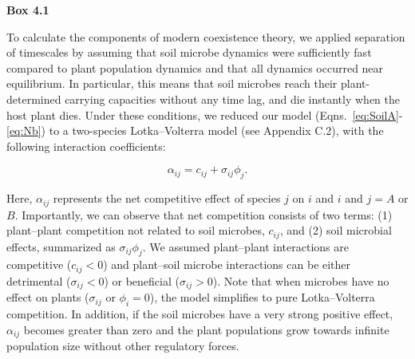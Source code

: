 \clearpage 
\begin{flushleft}
\textbf{Box 4.1}
\end{flushleft}
\begin{infobox}

To calculate the components of modern coexistence theory, we applied separation of timescales by assuming that soil microbe dynamics were sufficiently fast compared to plant population dynamics and that all dynamics occurred near equilibrium. In particular, this means that soil microbes reach their plant-determined carrying capacities without any time lag, and die instantly when the host plant dies. Under these conditions, we reduced our model (Eqns.~\ref{eq:SoilA}-\ref{eq:Nb}) to a two-species Lotka--Volterra model (see Appendix C.2), with the following interaction coefficients:

\begin{equation}
\alpha_{ij} = c_{ij} + \sigma_{ij}\phi_{j} .
\tag{4.5}\label{eq:alpha}
\end{equation}

Here, $\alpha_{ij}$ represents the net competitive effect of species $j$ on $i$ and $i$ and $j = A$ or $B$. Importantly, we can observe that net competition consists of two terms: (1) plant--plant competition not related to soil microbes, $c_{ij}$, and (2) soil microbial effects, summarized as $\sigma_{ij}\phi_{j}$.
We assumed plant--plant interactions are competitive ($c_{ij} < 0$) and plant--soil microbe interactions can be either detrimental ($\sigma_{ij} < 0$) or beneficial ($\sigma_{ij} > 0$). Note that when microbes have no effect on plants ($\sigma_{ij}$ or $\phi_{i} = 0$), the model simplifies to pure Lotka--Volterra competition. In addition, if the soil microbes have a very strong positive effect, $\alpha_{ij}$ becomes greater than zero and the plant populations grow towards infinite population size without other regulatory forces.
\par



\end{infobox}
